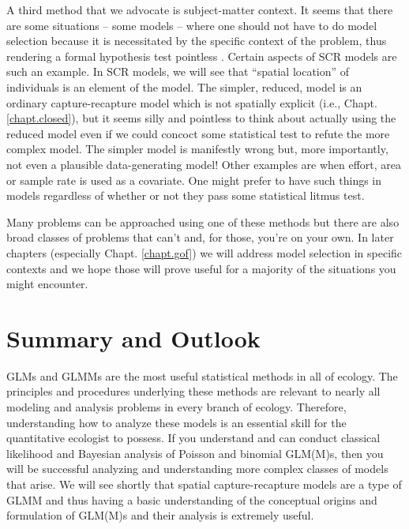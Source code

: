 {{{A third method that we advocate is subject-matter context. It seems
that there are some situations -- some models -- where one should not
have to do model selection because it is necessitated by the specific
context of the problem, thus rendering a formal hypothesis test
pointless \citep{johnson:1999}.  Certain aspects of SCR models are
such an example. In SCR models, we will see that ``spatial location''
of individuals is an element of the model. The simpler, reduced, model
is an ordinary capture-recapture model which is not spatially explicit
(i.e., Chapt. \ref{chapt.closed}), but it seems silly and pointless to
think about actually using the reduced model even if we could concoct
some statistical test to refute the more complex model.  The simpler
model is manifestly wrong but, more importantly, not even a plausible
data-generating model!  Other examples are when effort, area or sample
rate is used as a covariate. One might prefer to have such things in
models regardless of whether or not they pass some statistical litmus
test.

Many problems can be approached using one of these methods but there
are also broad classes of problems that can't and, for those, you're
on your own. In later chapters (especially Chapt. \ref{chapt.gof}) we
will address model selection in specific contexts and we hope those
will prove useful for a majority of the situations you might
encounter.



\section{ Summary and Outlook}

GLMs and GLMMs are the most useful statistical methods in all of
ecology. The principles and procedures underlying these methods are
relevant to nearly all modeling and analysis problems in every branch
of ecology. Therefore, understanding how to analyze these models is
an essential skill for the quantitative ecologist to possess.
 If you understand and
can conduct classical likelihood and Bayesian analysis of Poisson and
binomial GLM(M)s, then you will be successful analyzing and
understanding more complex classes of models that arise. We will see
shortly that spatial capture-recapture models are a type of GLMM
and thus having a basic
understanding of the conceptual origins and formulation of GLM(M)s and
their analysis is extremely useful.

}}}
